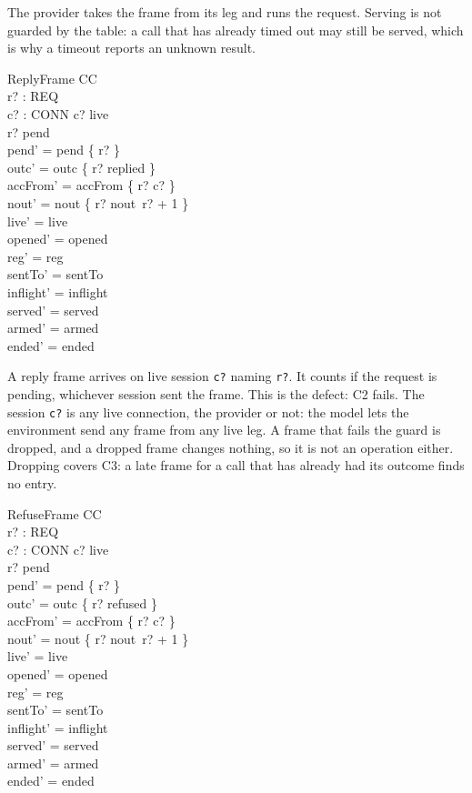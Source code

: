 \documentclass[a4paper,10pt,fleqn]{article}
\begin{document}
The provider takes the frame from its leg and runs the request.  Serving is
not guarded by the table: a call that has already timed out may still be
served, which is why a timeout reports an unknown result.

\begin{schema}{ReplyFrame}
  \Delta CC \\
  r? : REQ \\
  c? : CONN
\where
  c? \in live \\
  r? \in pend \\
  pend' = pend \setminus \{ r? \} \\
  outc' = outc \oplus \{ r? \mapsto replied \} \\
  accFrom' = accFrom \oplus \{ r? \mapsto c? \} \\
  nout' = nout \oplus \{ r? \mapsto nout~r? + 1 \} \\
  live' = live \\
  opened' = opened \\
  reg' = reg \\
  sentTo' = sentTo \\
  inflight' = inflight \\
  served' = served \\
  armed' = armed \\
  ended' = ended
\end{schema}

A reply frame arrives on live session \texttt{c?} naming \texttt{r?}.  It
counts if the request is pending, whichever session sent the frame.  This is
the defect: C2 fails.  The session \texttt{c?} is any live connection, the provider or not:
the model lets the environment send any frame from any live leg.  A frame
that fails the guard is dropped, and a dropped frame changes nothing, so it
is not an operation either.  Dropping covers C3: a late frame for a call
that has already had its outcome finds no entry.

\begin{schema}{RefuseFrame}
  \Delta CC \\
  r? : REQ \\
  c? : CONN
\where
  c? \in live \\
  r? \in pend \\
  pend' = pend \setminus \{ r? \} \\
  outc' = outc \oplus \{ r? \mapsto refused \} \\
  accFrom' = accFrom \oplus \{ r? \mapsto c? \} \\
  nout' = nout \oplus \{ r? \mapsto nout~r? + 1 \} \\
  live' = live \\
  opened' = opened \\
  reg' = reg \\
  sentTo' = sentTo \\
  inflight' = inflight \\
  served' = served \\
  armed' = armed \\
  ended' = ended
\end{schema}
\end{document}
